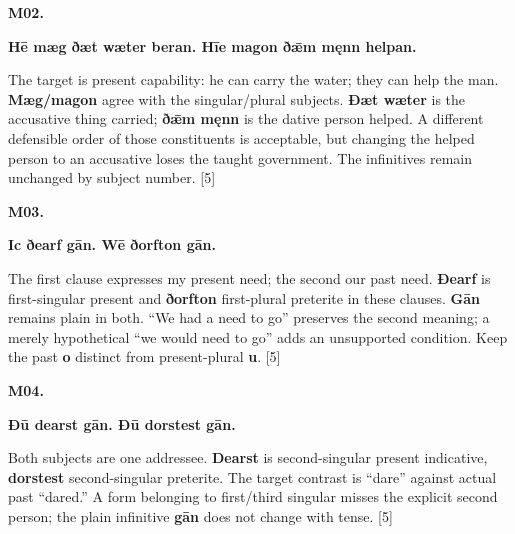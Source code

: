 \par\begin{minipage}{\linewidth}\raggedright
\textbf{M02.}

\textbf{Hē mæg ðæt wæter beran. Hīe magon ðǣm męnn helpan.}

The target is present capability: he can carry the water; they can help the man. \textbf{Mæg/\allowbreak{}magon} agree with the singular/\allowbreak{}plural subjects. \textbf{Ðæt wæter} is the accusative thing carried; \textbf{ðǣm męnn} is the dative person helped. A different defensible order of those constituents is acceptable, but changing the helped person to an accusative loses the taught government. The infinitives remain unchanged by subject number. [5]

\end{minipage}\par\addvspace{4pt}

\par\begin{minipage}{\linewidth}\raggedright
\textbf{M03.}

\textbf{Ic ðearf gān. Wē ðorfton gān.}

The first clause expresses my present need; the second our past need. \textbf{Ðearf} is first-singular present and \textbf{ðorfton} first-plural preterite in these clauses. \textbf{Gān} remains plain in both. “We had a need to go” preserves the second meaning; a merely hypothetical “we would need to go” adds an unsupported condition. Keep the past \textbf{o} distinct from present-plural \textbf{u}. [5]

\end{minipage}\par\addvspace{4pt}

\par\begin{minipage}{\linewidth}\raggedright
\textbf{M04.}

\textbf{Ðū dearst gān. Ðū dorstest gān.}

Both subjects are one addressee. \textbf{Dearst} is second-singular present indicative, \textbf{dorstest} second-singular preterite. The target contrast is “dare” against actual past “dared.” A form belonging to first/\allowbreak{}third singular misses the explicit second person; the plain infinitive \textbf{gān} does not change with tense. [5]

\end{minipage}\par\addvspace{4pt}

